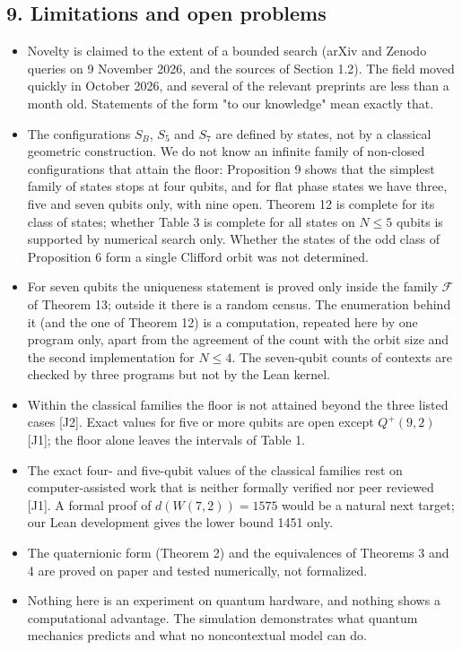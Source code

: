 \documentclass[11pt,a4paper]{article}
\providecommand{\tightlist}{\setlength{\itemsep}{0pt}\setlength{\parskip}{0pt}}
\begin{document}
\subsection{9. Limitations and open problems}\label{9-limitations-and-open-problems}

\begin{itemize}
\tightlist
\item
  Novelty is claimed to the extent of a bounded search (arXiv and Zenodo queries on 9 November 2026,
  and the sources of Section 1.2). The field moved quickly in October 2026, and several of the relevant
  preprints are less than a month old. Statements of the form "to our knowledge" mean exactly that.
\item
  The configurations \(S_B\), \(S_5\) and \(S_7\) are defined by states, not by a classical geometric
  construction. We do not know an infinite family of non-closed configurations that attain the floor:
  Proposition 9 shows that the simplest family of states stops at four qubits, and for flat phase
  states we have three, five and seven qubits only, with nine open. Theorem 12 is complete for its class
  of states; whether Table 3 is complete for all states on \(N \le 5\) qubits is supported by numerical
  search only. Whether the states of the odd class of Proposition 6 form a single Clifford orbit was not
  determined.
\item
  For seven qubits the uniqueness statement is proved only inside the family \(\mathcal{F}\) of
  Theorem 13; outside it there is a random census. The enumeration behind it (and the one of
  Theorem 12) is a computation, repeated here by one program only, apart from the agreement of the
  count with the orbit size and the second implementation for \(N \le 4\). The seven-qubit counts of
  contexts are checked by three programs but not by the Lean kernel.
\item
  Within the classical families the floor is not attained beyond the three listed cases {[}J2{]}. Exact
  values for five or more qubits are open except \(Q^+(9,2)\) {[}J1{]}; the floor alone leaves the intervals
  of Table 1.
\item
  The exact four- and five-qubit values of the classical families rest on computer-assisted work that is
  neither formally verified nor peer reviewed {[}J1{]}. A formal proof of \(d(W(7,2)) = 1575\) would be a
  natural next target; our Lean development gives the lower bound 1451 only.
\item
  The quaternionic form (Theorem 2) and the equivalences of Theorems 3 and 4 are proved on paper and
  tested numerically, not formalized.
\item
  Nothing here is an experiment on quantum hardware, and nothing shows a computational advantage.
  The simulation demonstrates what quantum mechanics predicts and what no noncontextual model can do.
\end{itemize}
\end{document}

